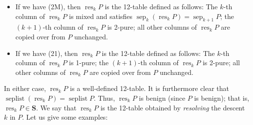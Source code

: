 \documentclass[numbers=enddot,12pt,final,onecolumn,notitlepage]{scrartcl}%
\theoremstyle{definition}
\begin{document}
\begin{itemize}
\item If we have (2M), then $\operatorname*{res}_{k}P$ is the
12-table defined as follows: The $k$-th column of $\operatorname*{res}_{k}P$
is mixed and satisfies $\operatorname*{sep}\nolimits_{k}\left(
\operatorname*{res}\nolimits_{k}P\right)  =\operatorname*{sep}\nolimits_{k+1}%
P$; the $\left(  k+1\right)  $-th column of $\operatorname*{res}%
\nolimits_{k}P$ is 2-pure; all other columns
of $\operatorname*{res}\nolimits_{k}P$ are copied over from $P$
unchanged.

\item If we have (21), then $\operatorname*{res}_{k}P$ is the
12-table defined as follows: The $k$-th column of $\operatorname*{res}_{k}P$
is 1-pure; the $\left(  k+1\right)  $-th column of $\operatorname*{res}%
\nolimits_{k}P$ is 2-pure; all other columns of $\operatorname*{res}%
\nolimits_{k}P$ are copied over from $P$ unchanged.
\end{itemize}

In either case, $\operatorname*{res}\nolimits_{k}P$ is a well-defined
12-table. It is furthermore clear that $\operatorname*{seplist}\left(
\operatorname*{res}\nolimits_{k}P\right)  =\operatorname*{seplist}P$. Thus,
$\operatorname*{res}\nolimits_{k}P$ is benign (since $P$ is benign); that is,
$\operatorname*{res}\nolimits_{k}P\in\mathbf{S}$. We say that
$\operatorname*{res}\nolimits_{k}P$ is the 12-table obtained by
\textit{resolving} the descent $k$ in $P$. Let us give some examples:

\end{document}
